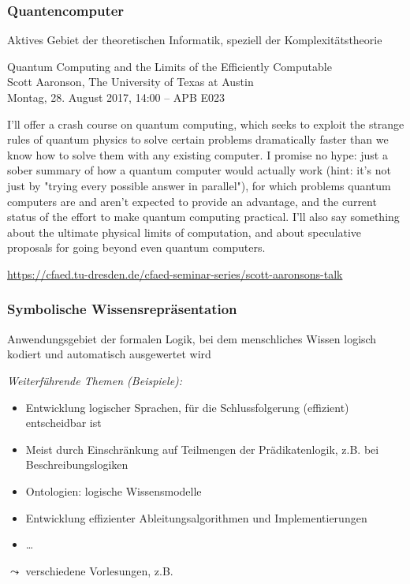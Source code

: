 \documentclass[onlymath]{beamer}
\begin{document}
\begin{frame}\frametitle{Quantencomputer}

Aktives Gebiet der theoretischen Informatik, speziell der Komplexitätstheorie\bigskip\pause


{\large Quantum Computing and the Limits of the Efficiently Computable}\\
\alert{Scott Aaronson}, The University of Texas at Austin\\
Montag, 28. August 2017, 14:00 -- APB E023
\bigskip

{\footnotesize
I'll offer a crash course on quantum computing, which seeks to exploit the strange rules of
quantum physics to solve certain problems dramatically faster than we know how to solve
them with any existing computer. I promise no hype: just a sober summary of how a quantum
computer would actually work (hint: it's not just by "trying every possible answer in parallel"), for
which problems quantum computers are and aren't expected to provide an advantage, and the
current status of the effort to make quantum computing practical. I'll also say something about
the ultimate physical limits of computation, and about speculative proposals for going beyond
even quantum computers.

}
\smallskip

\tiny
\url{https://cfaed.tu-dresden.de/cfaed-seminar-series/scott-aaronsons-talk}

\end{frame}

\begin{frame}\frametitle{Symbolische Wissensrepräsentation}

Anwendungsgebiet der formalen Logik, bei dem menschliches Wissen logisch kodiert und automatisch ausgewertet wird
\bigskip

\emph{Weiterführende Themen (Beispiele):}
\begin{itemize}
\item Entwicklung logischer Sprachen, für die Schlussfolgerung (effizient) entscheidbar ist
\item Meist durch Einschränkung auf Teilmengen der Prädikatenlogik, z.B. bei Beschreibungslogiken
\item Ontologien: logische Wissensmodelle
\item Entwicklung effizienter Ableitungsalgorithmen und Implementierungen
\item \ldots
\end{itemize}

$\leadsto$ verschiedene Vorlesungen, z.B. 

\end{frame}
\end{document}
